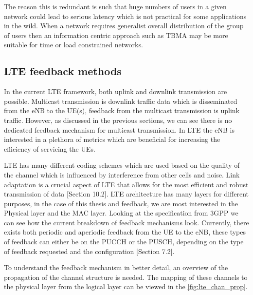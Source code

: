 \documentclass{article}
\begin{document}
The reason this is redundant is such that huge numbers of users in a given network could lead to serious latency which is not practical for some applications in the wild. When a network requires generalist overall distribution of the group of users then an information centric approach such as TBMA may be more suitable for time or load constrained networks.

\subsection{LTE feedback methods}\label{lte_feedback_current}

In the current LTE framework, both uplink and downlink transmission are possible. Multicast transmission is downlink traffic data which is disseminated from the eNB to the UE(s), feedback from the multicast transmission is uplink traffic. However, as discussed in the previous sections, we can see there is no dedicated feedback mechanism for multicast transmission. In LTE the eNB is interested in a plethora of metrics which are beneficial for increasing the efficiency of servicing the UEs. 

LTE has many different coding schemes which are used based on the quality of the channel which is influenced by interference from other cells and noise.  Link adaptation is a crucial aspect of LTE that allows for the most efficient and robust transmission of data \cite{umts_sesia}[Section 10.2]. LTE architecture has many layers for different purposes, in the case of this thesis and feedback, we are most interested in the Physical layer and the MAC layer. Looking at the specification from 3GPP we can see how the current breakdown of feedback mechanisms look. Currently, there exists both periodic and aperiodic feedback from the UE to the eNB, these types of feedback can either be on the PUCCH or the PUSCH, depending on the type of feedback requested and the configuration \cite{ETSITS136213}[Section 7.2]. 

To understand the feedback mechanism in better detail, an overview of the propagation of the channel structure is needed. The mapping of these channels to the physical layer from the logical layer can be viewed in the  \cref{fig:lte_chan_prop}.
\end{document}
